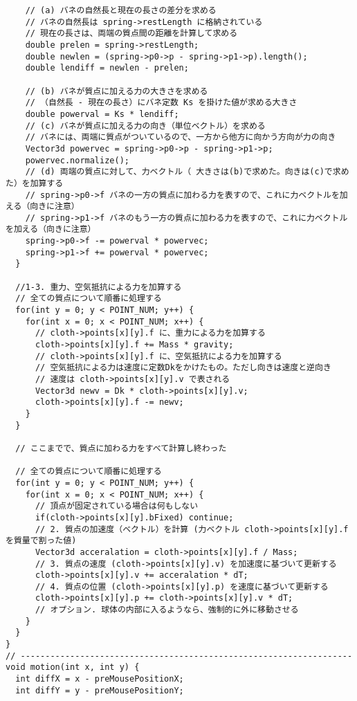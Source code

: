 \documentclass{scrartcl}
\begin{document}
\begin{verbatim}
    // (a) バネの自然長と現在の長さの差分を求める
    // バネの自然長は spring->restLength に格納されている
    // 現在の長さは、両端の質点間の距離を計算して求める
    double prelen = spring->restLength;
    double newlen = (spring->p0->p - spring->p1->p).length();
    double lendiff = newlen - prelen;

    // (b) バネが質点に加える力の大きさを求める
    // （自然長 - 現在の長さ）にバネ定数 Ks を掛けた値が求める大きさ
    double powerval = Ks * lendiff;
    // (c) バネが質点に加える力の向き（単位ベクトル）を求める
    // バネには、両端に質点がついているので、一方から他方に向かう方向が力の向き
    Vector3d powervec = spring->p0->p - spring->p1->p;
    powervec.normalize();
    // (d) 両端の質点に対して、力ベクトル（ 大きさは(b)で求めた。向きは(c)で求めた）を加算する
    // spring->p0->f バネの一方の質点に加わる力を表すので、これに力ベクトルを加える（向きに注意）
    // spring->p1->f バネのもう一方の質点に加わる力を表すので、これに力ベクトルを加える（向きに注意）
    spring->p0->f -= powerval * powervec;
    spring->p1->f += powerval * powervec;
  }

  //1-3. 重力、空気抵抗による力を加算する
  // 全ての質点について順番に処理する
  for(int y = 0; y < POINT_NUM; y++) {
    for(int x = 0; x < POINT_NUM; x++) {
      // cloth->points[x][y].f に、重力による力を加算する
      cloth->points[x][y].f += Mass * gravity;
      // cloth->points[x][y].f に、空気抵抗による力を加算する
      // 空気抵抗による力は速度に定数Dkをかけたもの。ただし向きは速度と逆向き
      // 速度は cloth->points[x][y].v で表される
      Vector3d newv = Dk * cloth->points[x][y].v;
      cloth->points[x][y].f -= newv;
    }
  }

  // ここまでで、質点に加わる力をすべて計算し終わった

  // 全ての質点について順番に処理する
  for(int y = 0; y < POINT_NUM; y++) {
    for(int x = 0; x < POINT_NUM; x++) {
      // 頂点が固定されている場合は何もしない
      if(cloth->points[x][y].bFixed) continue;			
      // 2. 質点の加速度（ベクトル）を計算 (力ベクトル cloth->points[x][y].f を質量で割った値)
      Vector3d acceralation = cloth->points[x][y].f / Mass;
      // 3. 質点の速度 (cloth->points[x][y].v) を加速度に基づいて更新する
      cloth->points[x][y].v += acceralation * dT;
      // 4. 質点の位置 (cloth->points[x][y].p) を速度に基づいて更新する
      cloth->points[x][y].p += cloth->points[x][y].v * dT;
      // オプション. 球体の内部に入るようなら、強制的に外に移動させる
    }
  }
}
// -------------------------------------------------------------------
void motion(int x, int y) {
  int diffX = x - preMousePositionX;
  int diffY = y - preMousePositionY;


\end{verbatim}
\end{document}
